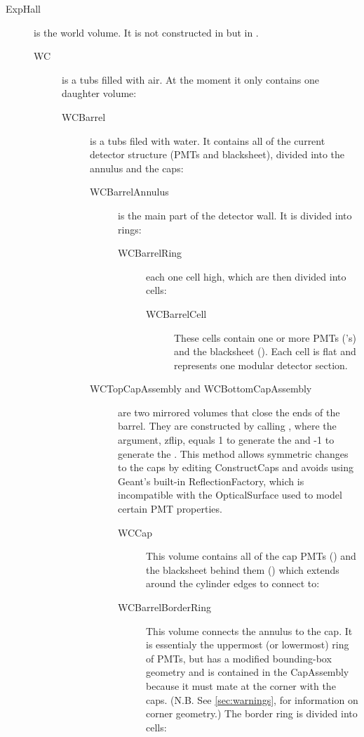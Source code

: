 \begin{description}
  \item[ExpHall] is the world volume. It is not constructed in   but in .
  \begin{description}
    \item[WC] is a tubs filled with air. At the moment it  only contains one daughter volume:
    \begin{description}
      \item[WCBarrel] is a tubs filed with water. It contains all of the current detector structure (PMTs and blacksheet), divided into the annulus and the caps:
      \begin{description}
        \item[WCBarrelAnnulus] is the main part of the detector wall. It is divided into rings:
        \begin{description}
          \item[WCBarrelRing] each one cell high, which are then divided into cells:
          \begin{description}
            \item[WCBarrelCell] These cells contain one or more PMTs ('s) and the blacksheet ().  Each cell is flat and represents one modular detector section.
          \end{description}
        \end{description}
        \item[WCTopCapAssembly and WCBottomCapAssembly] are two mirrored volumes that close the ends of the barrel.  They are constructed by calling , where the argument, zflip, equals 1 to generate the  and -1 to generate the .  This method allows symmetric changes to the caps by editing ConstructCaps and avoids using Geant's built-in ReflectionFactory, which is incompatible with the OpticalSurface used to model certain PMT properties.
        \begin{description}
          \item[WCCap] This volume contains all of the cap PMTs () and the blacksheet behind them () which extends around the cylinder edges to connect to:
          \item[WCBarrelBorderRing] This volume connects the annulus to the cap.  It is essentialy the uppermost (or lowermost) ring of PMTs, but has a modified  bounding-box geometry and is contained in the CapAssembly because it must mate at the corner with the caps.  (N.B.  See \ref{sec:warnings}, for information on corner geometry.)  The border ring is divided into cells:

\end{description}
\end{description}
\end{description}
\end{description}
\end{description}
